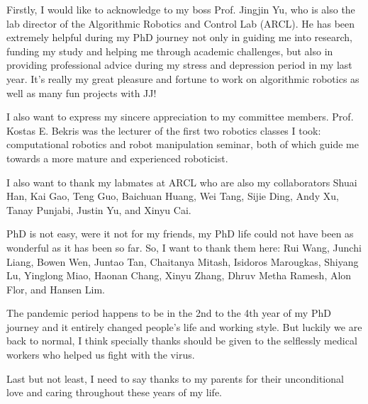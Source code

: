 
\begin{acknowledgments}
Firstly, I would like to acknowledge to my boss Prof. Jingjin Yu, 
who is also the lab director of the Algorithmic Robotics and Control Lab (ARCL). 
He has been extremely helpful during my PhD journey 
not only in guiding me into research, funding my study and helping me through academic challenges, 
but also in providing professional advice during my stress and depression period in my last year. 
It's really my great pleasure and fortune to work on algorithmic robotics 
as well as many fun projects with JJ! 

I also want to express my sincere appreciation to my committee members. 
Prof. Kostas E. Bekris was the lecturer of the first two robotics classes I took: 
computational robotics and robot manipulation seminar, both of which guide me 
towards a more mature and experienced roboticist. 

I also want to thank my labmates at ARCL who are also my collaborators Shuai Han, 
Kai Gao, Teng Guo, Baichuan Huang, Wei Tang, Sijie Ding, Andy Xu, Tanay Punjabi, 
Justin Yu, and Xinyu Cai. 

PhD is not easy, were it not for my friends, my PhD life 
could not have been as wonderful as it has been so far. 
So, I want to thank them here: Rui Wang, Junchi Liang, Bowen Wen, Juntao Tan, Chaitanya Mitash, 
Isidoros Marougkas, Shiyang Lu, Yinglong Miao, Haonan Chang, Xinyu Zhang, 
Dhruv Metha Ramesh, Alon Flor, and Hansen Lim. 

The pandemic period happens to be in the 2nd to the 4th year of my PhD journey and it entirely changed people's 
life and working style. But luckily we are back to normal, I think specially thanks should be given to the 
selflessly medical workers who helped us fight with the virus. 

Last but not least, I need to say thanks to my parents for their unconditional love 
and caring throughout these years of my life. 

\end{acknowledgments}
